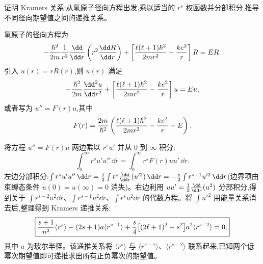 \begin{question}
证明 Kramers 关系:从氢原子径向方程出发,乘以适当的 $r^s$ 权函数并分部积分,推导不同径向期望值之间的递推关系。
\begin{solution}
氢原子的径向方程为
\[
-{\hbar^2\over2m}{1\over r^2}{\dd\over\dd r}\left(r^2{\dd R\over\dd r}\right)
+ \left[{\ell(\ell+1)\hbar^2\over2mr^2} - {ke^2\over r}\right]R = E R.
\]
引入 $u(r)=rR(r)$,则 $u(r)$ 满足
\[
-{\hbar^2\over2m}{\dd^2 u\over\dd r^2} + \left[{\ell(\ell+1)\hbar^2\over2mr^2} - {ke^2\over r}\right]u = E u,
\]
或者写为 $u'' = F(r)u$,其中
\[
F(r) = {2m\over\hbar^2}\left({\ell(\ell+1)\hbar^2\over2mr^2} - {ke^2\over r} - E\right).
\]

将方程 $u'' = F(r)u$ 两边乘以 $r^s u'$ 并从 $0$ 到 $\infty$ 积分:
\[
\int_0^\infty r^s u' u''\,\dd r = \int_0^\infty r^s F(r) u u'\,\dd r.
\]
左边分部积分:$\int r^s u' u''\,\dd r = {1\over2}\int r^s {\dd\over\dd r}(u'^2)\,\dd r = -{s\over2}\int r^{s-1} u'^2\,\dd r$(边界项由束缚态条件 $u(0)=u(\infty)=0$ 消失)。右边利用 $u u' = {1\over2}{\dd\over\dd r}(u^2)$ 分部积分,得到关于 $\int r^{s-2}u^2\dd r$、$\int r^{s-1}u^2\dd r$、$\int r^{s}u^2\dd r$ 的代数方程。将 $\int u'^2$ 用能量关系消去后,整理得到 Kramers 递推关系:
\[
\boxed{{s+1\over n^2}\langle r^s\rangle - (2s+1)a\langle r^{s-1}\rangle + {s\over4}\bigl[(2\ell+1)^2-s^2\bigr]a^2\langle r^{s-2}\rangle = 0.}
\]
其中 $a$ 为玻尔半径。该递推关系将 $\langle r^s\rangle$ 与 $\langle r^{s-1}\rangle$、$\langle r^{s-2}\rangle$ 联系起来,已知两个低幂次期望值即可递推求出所有正负幂次的期望值。
\end{solution}
\end{question}

